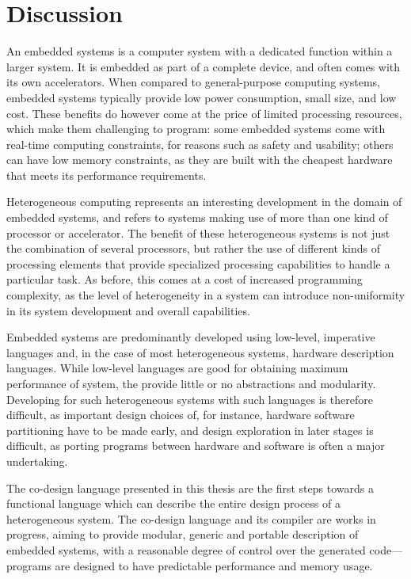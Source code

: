 \documentclass[../paper.tex]{subfiles}
\begin{document}
\section{Discussion}
\label{disc}

An embedded systems is a computer system with a dedicated function within a larger system. It is embedded as part of a complete device, and often comes with its own accelerators. When compared to general-purpose computing systems, embedded systems typically provide low power consumption, small size, and low cost. These benefits do however come at the price of limited processing resources, which make them challenging to program: some embedded systems come with real-time computing constraints, for reasons such as safety and usability; others can have low memory constraints, as they are built with the cheapest hardware that meets its performance requirements.

Heterogeneous computing represents an interesting development in the domain of embedded systems, and refers to systems making use of more than one kind of processor or accelerator. The benefit of these heterogeneous systems is not just the combination of several processors, but rather the use of different kinds of processing elements that provide specialized processing capabilities to handle a particular task. As before, this comes at a cost of increased programming complexity, as the level of heterogeneity in a system can introduce non-uniformity in its system development and overall capabilities.

Embedded systems are predominantly developed using low-level, imperative languages and, in the case of most heterogeneous systems, hardware description languages. While low-level languages are good for obtaining maximum performance of system, the provide little or no abstractions and modularity. Developing for such heterogeneous systems with such languages is therefore difficult, as important design choices of, for instance, hardware software partitioning have to be made early, and design exploration in later stages is difficult, as porting programs between hardware and software is often a major undertaking.

The co-design language presented in this thesis are the first steps towards a functional language which can describe the entire design process of a heterogeneous system. The co-design language and its compiler are works in progress, aiming to provide modular, generic and portable description of embedded systems, with a reasonable degree of control over the generated code---programs are designed to have predictable performance and memory usage.
\end{document}
